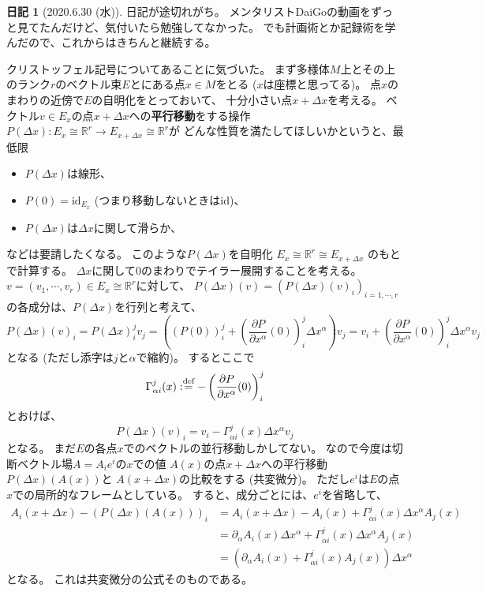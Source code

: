 \documentclass[uplatex]{jsarticle}
\theoremstyle{definition}
\newtheorem*{nikki*}{日記}
\def\id{\mathrm{id}}
\def\R{\mathbb{R}}
\def\dfn{:\overset{\mbox{{\scriptsize def}}}{=}}
\begin{document}
\begin{nikki*}[2020.6.30 (水)]
  日記が途切れがち。
  メンタリストDaiGoの動画をずっと見てたんだけど、気付いたら勉強してなかった。
  でも計画術とか記録術を学んだので、これからはきちんと継続する。

  クリストッフェル記号についてあることに気づいた。
  まず多様体\(M\)上とその上のランク\(r\)のベクトル束\(E\)とにある点\(x\in M\)をとる
  (\(x\)は座標と思ってる)。
  点\(x\)のまわりの近傍で\(E\)の自明化をとっておいて、
  十分小さい点\(x+\Delta x\)を考える。
  ベクトル\(v\in E_x\)の点\(x+\Delta x\)への\textbf{平行移動}をする操作
  \(P(\Delta x) : E_x\cong \R^r \to E_{x+\Delta x}\cong \R^r\)が
  どんな性質を満たしてほしいかというと、最低限
  \begin{itemize}
    \item \(P(\Delta x)\)は線形、
    \item \(P(0) = \id_{E_x}\) (つまり移動しないときは\(\id\))、
    \item \(P(\Delta x)\)は\(\Delta x\)に関して滑らか、
  \end{itemize}
  などは要請したくなる。
  このような\(P(\Delta x)\)を自明化
  \(E_x\cong \R^r \cong E_{x+\Delta x}\)
  のもとで計算する。
  \(\Delta x\)に関して\(0\)のまわりでテイラー展開することを考える。
  \(v=(v_1,\cdots, v_r)\in E_x\cong \R^r\)に対して、
  \(P(\Delta x)(v) = (P(\Delta x)(v)_i)_{i=1,\cdots ,r}\)
  の各成分は、\(P(\Delta x)\)を行列と考えて、
  \[
  P(\Delta x)(v)_i
  = P(\Delta x)^j_iv_j
  = \left(\left( P(0)\right)^j_i +
  \left( \frac{\partial P}{\partial x^{\alpha}}(0) \right)^j_i
  \Delta x^\alpha \right) v_j
  = v_i +
  \left( \frac{\partial P}{\partial x^{\alpha}}(0) \right)^j_i \Delta x^\alpha v_j
  \]
  となる (ただし添字は\(j\)と\(\alpha\)で縮約)。
  するとここで
  \[
  \Gamma_{\alpha i}^j(x) \dfn -\left( \frac{\partial P}{\partial x^{\alpha}}(0) \right)^j_i
  \]
  とおけば、
  \[
  P(\Delta x)(v)_i = v_i - \Gamma_{\alpha i}^j(x) \Delta x^\alpha v_j
  \]
  となる。
  まだ\(E\)の各点\(x\)でのベクトルの並行移動しかしてない。
  なので今度は切断ベクトル場\(A = A_ie^i\)の\(x\)での値
  \(A(x)\)の点\(x+\Delta x\)への平行移動
  \(P(\Delta x)(A(x))\)と
  \(A(x+\Delta x)\)の比較をする (共変微分)。
  ただし\(e^i\)は\(E\)の点\(x\)での局所的なフレームとしている。
  すると、成分ごとには、\(e^i\)を省略して、
  \begin{align*}
    A_i(x+\Delta x) - \left(P(\Delta x)(A(x))\right)_i
    &= A_i(x+\Delta x) - A_i(x) + \Gamma_{\alpha i}^j(x)\Delta x^{\alpha} A_j(x) \\
    &= \partial_\alpha A_i(x)\Delta x^\alpha
    + \Gamma_{\alpha i}^j(x)\Delta x^\alpha A_j(x) \\
    &= \left( \partial_\alpha A_i (x)
    + \Gamma_{\alpha i}^j(x)A_j(x)\right) \Delta x^\alpha
  \end{align*}
  となる。
  これは共変微分の公式そのものである。
\end{nikki*}
\end{document}
